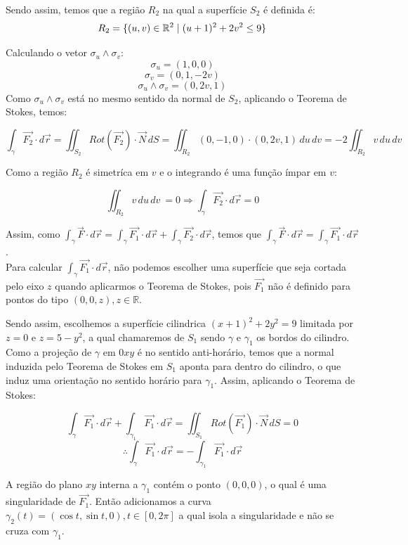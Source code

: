 \documentclass[12pt,a4paper]{article}
\begin{document}
Sendo assim, temos que a região $R_2$ na qual a superfície $S_2$ é definida é: \\
$$ R_2 = \{ (u,v) \in \mathbb{R}^2 \hspace{1 mm} | \hspace{1 mm}  (u+1)^2 + 2v^2 \leq 9 \} $$

Calculando o vetor $\sigma_{u} \wedge \sigma_{v}$:
$$ \sigma_u = (1,0, 0 ) $$
$$ \sigma_v = (0,1, -2v ) $$
$$  \sigma_u \wedge \sigma_v = (0 , 2v, 1 ) $$
Como $\sigma_u \wedge \sigma_v$ está no mesmo sentido da normal de $S_2$, aplicando o Teorema de Stokes, temos:

$$ \int_{\gamma} \vec{F_2} \cdot d\vec{r} = \iint_{S_2} Rot(\vec{F_2}) \cdot \vec{N} \,dS = \iint_{R_2} ( 0, -1, 0 )  \cdot ( 0, 2v, 1 )  \,du \,dv = -2 \iint_{R_2} v \,du \,dv $$

Como a região $R_2$ é simetríca em $v$ e o integrando é uma função ímpar em $v$:

$$ \iint_{R_2} v \,du \,dv\ = 0 \Rightarrow  \int_{\gamma} \vec{F_2} \cdot d\vec{r} = 0 $$

Assim, como $ \displaystyle  \int_{\gamma} \vec{F} \cdot d\vec{r} =  \int_{\gamma} \vec{F_1} \cdot d\vec{r} +  \int_{\gamma} \vec{F_2} \cdot d\vec{r} $, temos que $ \displaystyle \int_{\gamma} \vec{F} \cdot d\vec{r} =  \int_{\gamma} \vec{F_1} \cdot d\vec{r} $. \\

Para calcular $ \displaystyle \int_{\gamma} \vec{F_1} \cdot d\vec{r} $, não podemos escolher uma superfície que seja cortada pelo eixo $z$ quando aplicarmos o Teorema de Stokes, pois $\vec{F_1}$ não é definido para pontos do tipo $(0,0,z), z \in \mathbb{R} $.

Sendo assim, escolhemos a superfície cilindrica $(x+1)^2 + 2y^2 = 9$ limitada por $z = 0 $ e $z = 5 - y^2 $, a qual chamaremos de $S_1$ sendo $\gamma$ e $\gamma_1$ os bordos do cilindro. Como a projeção de $\gamma $ em $0xy$ é no sentido anti-horário, temos que a normal induzida pelo Teorema de Stokes em $S_1$ aponta para dentro do cilindro, o que induz uma orientação no sentido horário para $ \gamma_1$. Assim, aplicando o Teorema de Stokes:

$$ \int_{\gamma} \vec{F_1} \cdot d\vec{r} + \int_{\gamma_1} \vec{F_1} \cdot d\vec{r} = \iint_{S_1} Rot(\vec{F_1}) \cdot \vec{N} \,dS = 0 $$
$$ \therefore \int_{\gamma} \vec{F_1} \cdot d\vec{r} = - \int_{\gamma_1} \vec{F_1} \cdot d\vec{r} $$

A região do plano $xy$ interna a $\gamma_1$ contém o ponto $(0,0,0)$, o qual é uma singularidade de $\vec{F_1}$. Então adicionamos a curva $\gamma_2 (t) = ( \cos t, \sin t, 0), t \in [0, 2 \pi] $ a qual isola a singularidade e não se cruza com  $\gamma_1$.
\end{document}

